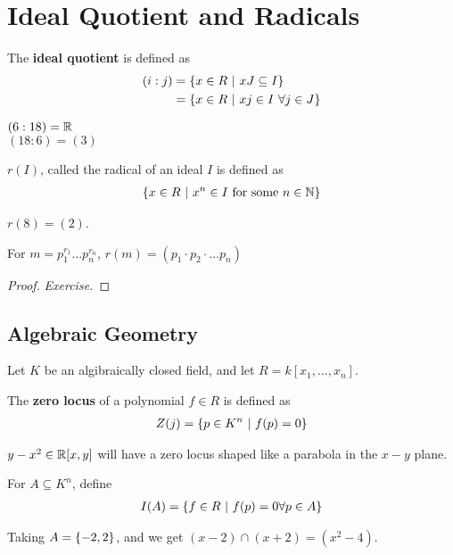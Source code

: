 \documentclass[12pt, twosided]{article}
\begin{document}
\section{Ideal Quotient and Radicals}

\begin{df}
  The \textbf{ideal quotient} is defined as
  \begin{align*}
    (i:j) &= \left\{ x \in R \ \middle\vert\  xJ \subseteq I \right\} \\
          &= \left\{ x \in R \ \middle\vert\  xj \in I\ \forall j \in J \right\}
  \end{align*}
\end{df}
\begin{exa}
  \((6:18) = \mathbb{R}\)\\
  \((18:6) = (3)\)
\end{exa}
\begin{df}
  \(r(I)\), called the radical of an ideal \(I\) is defined as
  \begin{align*}
    \left\{ x \in R \ \middle\vert\  x^n \in I \text{ for some } n \in \mathbb{N} \right\}
  \end{align*}
\end{df}

\begin{exa}
  \(r(8) = (2)\).
\end{exa}

\begin{prop}\label{Prob2.3}
  For \(m = p_1^{r_1}\ldots p_n^{r_n}\), \(r(m) = (p_1 \cdot p_2 \cdot \ldots p_n)\)
\end{prop}
\begin{proof}
  {\color{red} \textit{Exercise.}}
\end{proof}
\subsection{Algebraic Geometry}

Let \(K\) be an algibraically closed field, and let \(R = k[x_1, \ldots, x_n]\).

\begin{df}
  The \textbf{zero locus} of a polynomial \(f \in R\) is defined as
  \begin{align*}
    Z(j) = \left\{ p \in K^n \ \middle\vert\  f(p) = 0 \right\}
  \end{align*}
\end{df}

\begin{exa}
  \(y - x^2 \in \mathbb{R}[x, y]\) will have a zero locus shaped like a parabola in the \(x-y\) plane.
\end{exa}
  \begin{df}
    For \(A \subseteq K^n\), define
    \begin{align*}
      I(A) = \left\{ f \in R \ \middle\vert\  f(p) = 0 \forall p \in A \right\}
    \end{align*}
  \end{df}
  \begin{exa}
    Taking \(A = \left\{ -2, 2 \right\}\), and we get \((x-2) \cap (x + 2) = (x^2 - 4)\).
  \end{exa}
\end{document}
